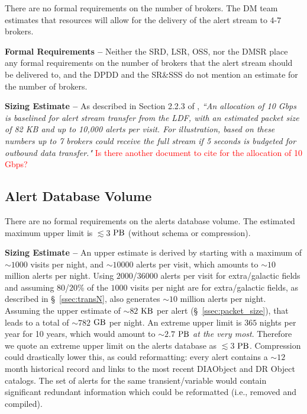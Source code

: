 \documentclass[DM,authoryear,toc]{lsstdoc}
\begin{document}
There are no formal requirements on the number of brokers. The DM team estimates that resources will allow for the delivery of the alert stream to $4$-$7$ brokers.

{\bf Formal Requirements --} Neither the SRD, LSR, OSS, nor the DMSR place any formal requirements on the number of brokers that the alert stream should be delivered to, and the DPDD and the SR\&SSS do not mention an estimate for the number of brokers. 

{\bf Sizing Estimate --} As described in Section 2.2.3 of , {\it ``An allocation of 10 Gbps is baselined for alert stream transfer from the LDF, with an estimated packet size of 82 KB and up to 10,000 alerts per visit. For illustration, based on these numbers up to 7 brokers could receive the full stream if 5 seconds is budgeted for outbound data transfer."} \textcolor{red}{Is there another document to cite for the allocation of 10 Gbps?}


\subsection{Alert Database Volume}\label{ssec:adb_volume}

There are no formal requirements on the alerts database volume. The estimated maximum upper limit is $\lesssim3$ $\rm PB$ (without schema or compression).

{\bf Sizing Estimate --} An upper estimate is derived by starting with a maximum of $\sim1000$ visits per night, and $\sim10000$ alerts per visit, which amounts to $\sim10$ million alerts per night. Using $2000$/$36000$ alerts per visit for extra/galactic fields and assuming $80$/$20$\% of the $1000$ visits per night are for extra/galactic fields, as described in \S~\ref{ssec:transN}, also generates $\sim 10$ million alerts per night. Assuming the upper estimate of $\sim82$ $\rm KB$ per alert (\S~\ref{ssec:packet_size}), that leads to a total of $\sim782$ $\rm GB$ per night. An extreme upper limit is $365$ nights per year for 10 years, which would amount to $\sim2.7$ $\rm PB$ {\it at the very most}. Therefore we quote an extreme upper limit on the alerts database as $\lesssim3$ $\rm PB$. Compression could drastically lower this, as could reformatting: every alert contains a $\sim12$ month historical record and links to the most recent DIAObject and DR Object catalogs. The set of alerts for the same transient/variable would contain significant redundant information which could be reformatted (i.e., removed and compiled). 
\end{document}

